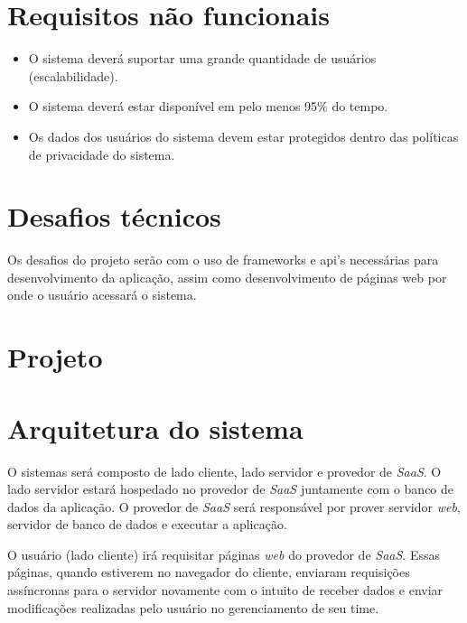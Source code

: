 \documentclass[11pt,a4paper]{article}
\begin{document}
	\section*{Requisitos não funcionais}
		\begin{itemize}
			\item O sistema deverá suportar uma grande quantidade de usuários (escalabilidade).
			\item O sistema deverá estar disponível em pelo menos 95\% do tempo.
			\item Os dados dos usuários do sistema devem estar protegidos dentro das políticas de privacidade do sistema.
		\end{itemize}

	\section*{Desafios técnicos}
		Os desafios do projeto serão com o uso de frameworks e api's necessárias para desenvolvimento da aplicação, assim como desenvolvimento de páginas web por onde o usuário acessará o sistema.
        
    \section{Projeto}
	\section*{Arquitetura do sistema}
    	O sistemas será composto de lado cliente, lado servidor e provedor de \textit{SaaS}. O lado servidor estará hospedado no provedor de \textit{SaaS} juntamente com o banco de dados da aplicação. O provedor de \textit{SaaS} será responsável por prover servidor \textit{web}, servidor de banco de dados e executar a aplicação.
    
		O usuário (lado cliente) irá requisitar páginas \textit{web} do provedor de \textit{SaaS}. Essas páginas, quando estiverem no navegador do cliente, enviaram requisições assíncronas para o servidor novamente com o intuito de receber dados e enviar modificações realizadas pelo usuário no gerenciamento de seu time.
    
\end{document}
